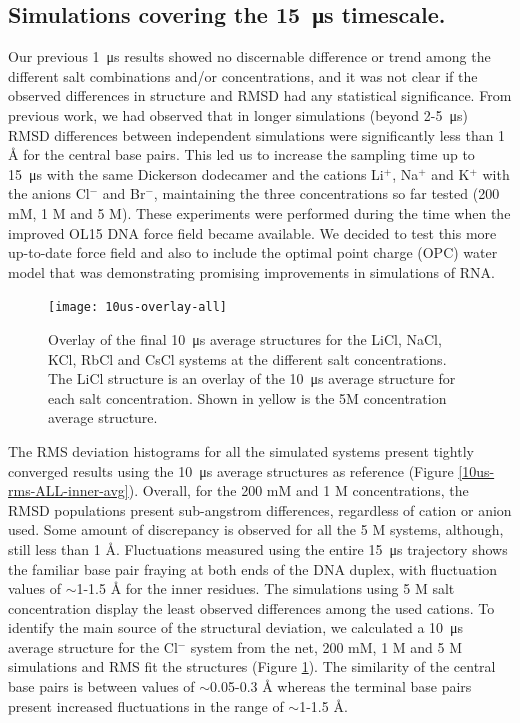 \documentclass[9pt,lessons]{livecoms}
\begin{document}
\subsection{Simulations covering the \SI{15}{\micro\second} timescale.}

Our previous \SI{1}{\micro\second} results showed no discernable
difference or trend among the different salt combinations and/or
concentrations, and it was not clear if the observed differences in
structure and RMSD had any statistical significance. From previous
work, we had observed that in longer simulations (beyond
2-5\SI{}{\micro\second}) RMSD differences between independent
simulations were significantly less than 1 Å for the central base
pairs\cite{Galindo-Murillo2014,Galindo-Murillo2014a}. This led us to
increase the sampling time up to \SI{15}{\micro\second} with the same
Dickerson dodecamer and the cations Li$^{+}$, Na$^{+}$ and K$^{+}$
with the anions Cl$^{-}$ and Br$^{-}$, maintaining the three
concentrations so far tested (200 mM, 1 M and 5 M).  These experiments
were performed during the time when the improved OL15 DNA force field
became available\cite{Galindo-Murillo2016,Zgarbova2015}.  We decided
to test this more up-to-date force field and also to include the
optimal point charge (OPC) water model\cite{Izadi2014} that was
demonstrating promising improvements in simulations of
RNA\cite{Bergonzo2015}.


\begin{figure}[h]
\centering
\texttt{[image: 10us-overlay-all]}
\caption{Overlay of the final \SI{10}{\micro\second} average structures for the LiCl, NaCl, KCl, RbCl and CsCl systems at the different salt concentrations. The LiCl structure is an overlay of the \SI{10}{\micro\second} average structure for each salt concentration. Shown in yellow is the 5M concentration average structure.}
\label{10us-overlay-all}
\end{figure}

The RMS deviation histograms for all the simulated systems present tightly
converged results using the \SI{10}{\micro\second} average structures
as reference (Figure \ref{10us-rms-ALL-inner-avg}). Overall, for the
200 mM and 1 M concentrations, the RMSD populations present
sub-angstrom differences, regardless of cation or anion used. Some
amount of discrepancy is observed for all the 5 M systems, although,
still less than 1 Å. Fluctuations measured using the entire
\SI{15}{\micro\second} trajectory shows the familiar base pair fraying
at both ends of the DNA duplex, with fluctuation values of $\sim$1-1.5 Å
for the inner residues. The simulations using 5 M salt concentration
display the least observed differences among the used cations. To
identify the main source of the structural deviation, we calculated a
\SI{10}{\micro\second} average structure for the Cl$^{-}$ system from
the net, 200 mM, 1 M and 5 M simulations and RMS fit the structures
(Figure \ref{10us-overlay-all}). The similarity of the central base
pairs is between values of $\sim$0.05-0.3 Å whereas the terminal base pairs
present increased fluctuations in the range of $\sim$1-1.5 Å.
\end{document}
